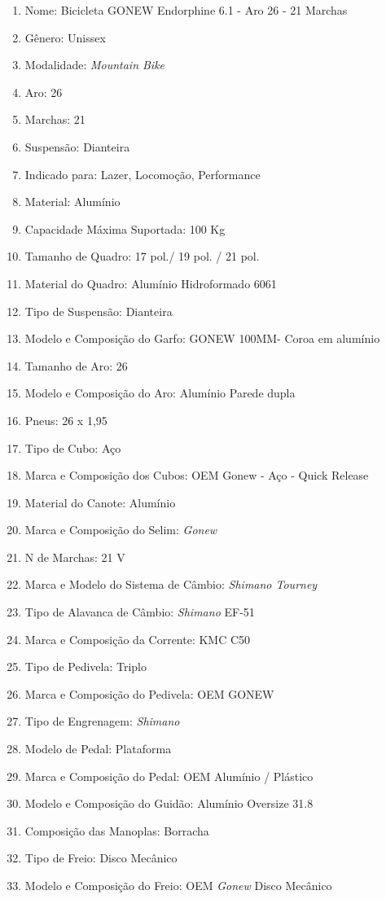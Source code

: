 \begin{itemize}
\begin{itemize}
		\begin{enumerate}
		\item Nome:  Bicicleta GONEW Endorphine 6.1 - Aro 26 - 21 Marchas
		\item Gênero:  Unissex
		\item Modalidade: \textit{Mountain Bike}
		\item Aro: 26
 		\item Marchas: 21
		\item Suspensão: Dianteira
		\item Indicado para: Lazer, Locomoção, Performance
		\item Material: Alumínio
		\item Capacidade Máxima Suportada: 100 Kg
		\item Tamanho de Quadro: 17 pol./ 19 pol. / 21 pol.
		\item Material do Quadro: Alumínio Hidroformado 6061
		\item Tipo de Suspensão: Dianteira
		\item Modelo e Composição do Garfo: GONEW 100MM- Coroa em alumínio
		\item Tamanho de Aro: 26
		\item Modelo e Composição do Aro: Alumínio Parede dupla
		\item Pneus: 26 x 1,95
		\item Tipo de Cubo: Aço
		\item Marca e Composição dos Cubos: OEM Gonew - Aço - Quick Release
		\item Material do Canote: Alumínio
		\item Marca e Composição do Selim: \textit{Gonew}
		\item N de Marchas: 21 V
		\item Marca e Modelo do Sistema de Câmbio: \textit{Shimano Tourney}
		\item Tipo de Alavanca de Câmbio: \textit{Shimano} EF-51
		\item Marca e Composição da Corrente: KMC C50
		\item Tipo de Pedivela: Triplo
		\item Marca e Composição do Pedivela: OEM GONEW
		\item Tipo de Engrenagem: \textit{Shimano}
		\item Modelo de Pedal: Plataforma
		\item Marca e Composição do Pedal: OEM Alumínio / Plástico
		\item Modelo e Composição do Guidão: Alumínio Oversize 31.8
		\item Composição das Manoplas: Borracha
		\item Tipo de Freio: Disco Mecânico
 		\item Modelo e Composição do Freio: OEM \textit{Gonew} Disco Mecânico
		\end{enumerate}
	\end{itemize}
\end{itemize}
